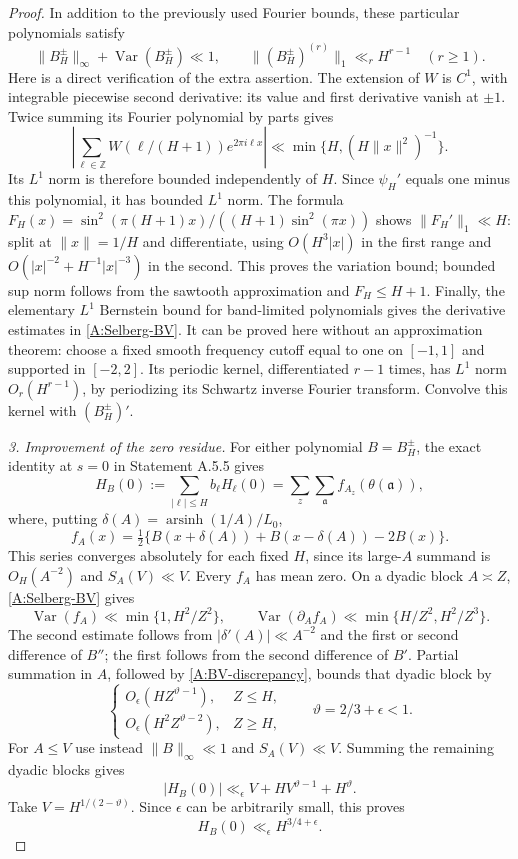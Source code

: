 \begin{proof}
In addition to the previously used Fourier bounds, these
particular polynomials satisfy
\begin{equation}\label{A:Selberg-BV}
 \|B_H^\pm\|_\infty+\operatorname{Var}(B_H^\pm)\ll1,
 \qquad \|(B_H^\pm)^{(r)}\|_1\ll_r H^{r-1}\quad(r\geq1).
\end{equation}
Here is a direct verification of the extra assertion.
The extension of $W$ is $C^1$, with integrable piecewise second
derivative: its value and first derivative vanish at $\pm1$.
Twice summing its Fourier polynomial by parts gives
\[
 \left|\sum_{\ell\in\mathbb Z}W(\ell/(H+1))e^{2\pi i\ell x}\right|
 \ll \min\{H,(H\|x\|^2)^{-1}\}.
\]
Its $L^1$ norm is therefore bounded independently of $H$.
Since $\psi_H'$ equals one minus this polynomial, it has
bounded $L^1$ norm. The formula
$F_H(x)=\sin^2(\pi(H+1)x)/((H+1)\sin^2(\pi x))$
shows $\|F_H'\|_1\ll H$: split at $\|x\|=1/H$ and
differentiate, using $O(H^3|x|)$ in the first range and
$O(|x|^{-2}+H^{-1}|x|^{-3})$ in the second.
This proves the variation bound; bounded sup norm follows from
the sawtooth approximation and $F_H\leq H+1$.
Finally, the elementary $L^1$ Bernstein bound for band-limited
polynomials gives the derivative estimates in
\eqref{A:Selberg-BV}. It can be proved here without an
approximation theorem: choose a fixed smooth frequency cutoff
equal to one on $[-1,1]$ and supported in $[-2,2]$.
Its periodic kernel, differentiated $r-1$ times, has $L^1$
norm $O_r(H^{r-1})$, by periodizing its Schwartz inverse Fourier
transform. Convolve this kernel with $(B_H^\pm)'$.

\emph{3. Improvement of the zero residue.}
For either polynomial $B=B_H^\pm$, the exact identity at $s=0$
in Statement A.5.5 gives
\[
 H_B(0):=\sum_{|\ell|\leq H}b_\ell H_\ell(0)
   =\sum_z\sum_{\mathfrak a}f_{A_z}(\theta(\mathfrak a)),
\]
where, putting $\delta(A)=\operatorname{arsinh}(1/A)/L_0$,
\[
 f_A(x)=\tfrac12\{B(x+\delta(A))+B(x-\delta(A))-2B(x)\}.
\]
This series converges absolutely for each fixed $H$,
since its large-$A$ summand is $O_H(A^{-2})$ and
$S_A(V)\ll V$. Every $f_A$ has mean zero.
On a dyadic block $A\asymp Z$, \eqref{A:Selberg-BV} gives
\[
 \operatorname{Var}(f_A)\ll
      \min\{1,H^2/Z^2\},\qquad
 \operatorname{Var}(\partial_A f_A)
      \ll\min\{H/Z^2,H^2/Z^3\}.
\]
The second estimate follows from
$|\delta'(A)|\ll A^{-2}$ and the first or second difference
of $B''$; the first follows from the second difference of $B'$.
Partial summation in $A$, followed by
\eqref{A:BV-discrepancy}, bounds that dyadic block by
\[
 \begin{cases}
 O_\epsilon(HZ^{\vartheta-1}),&Z\leq H,\\
 O_\epsilon(H^2Z^{\vartheta-2}),&Z\geq H,
 \end{cases}
 \qquad \vartheta=2/3+\epsilon<1.
\]
For $A\leq V$ use instead $\|B\|_\infty\ll1$ and
$S_A(V)\ll V$. Summing the remaining dyadic blocks gives
\[
 |H_B(0)|\ll_\epsilon
 V+HV^{\vartheta-1}+H^\vartheta.
\]
Take $V=H^{1/(2-\vartheta)}$. Since $\epsilon$ can be
arbitrarily small, this proves
\begin{equation}\label{A:zero-residue-improved}
 H_B(0)\ll_\epsilon H^{3/4+\epsilon}.
\end{equation}


\end{proof}
